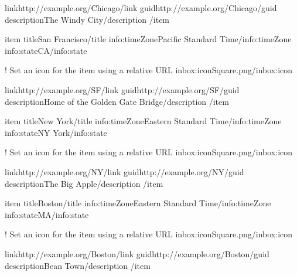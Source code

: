 \documentclass[letterpaper,12pt,english,openany,oneside]{sphinxmanual}
\begin{document}
\begin{sphinxVerbatim}[commandchars=\\\{\}]
           \PYGZlt{}link\PYGZgt{}http://example.org/Chicago\PYGZlt{}/link\PYGZgt{}
           \PYGZlt{}guid\PYGZgt{}http://example.org/Chicago\PYGZlt{}/guid\PYGZgt{}
           \PYGZlt{}description\PYGZgt{}The Windy City\PYGZlt{}/description\PYGZgt{}
       \PYGZlt{}/item\PYGZgt{}

       \PYGZlt{}item\PYGZgt{}
           \PYGZlt{}title\PYGZgt{}San Francisco\PYGZlt{}/title\PYGZgt{}
           \PYGZlt{}info:timeZone\PYGZgt{}Pacific Standard Time\PYGZlt{}/info:timeZone\PYGZgt{}
           \PYGZlt{}info:state\PYGZgt{}CA\PYGZlt{}/info:state\PYGZgt{}

           \PYGZlt{}!\PYGZhy{}\PYGZhy{} Set an icon for the item using a relative URL \PYGZhy{}\PYGZhy{}\PYGZgt{}
           \PYGZlt{}inbox:icon\PYGZgt{}Square.png\PYGZlt{}/inbox:icon\PYGZgt{}

           \PYGZlt{}link\PYGZgt{}http://example.org/SF\PYGZlt{}/link\PYGZgt{}
           \PYGZlt{}guid\PYGZgt{}http://example.org/SF\PYGZlt{}/guid\PYGZgt{}
           \PYGZlt{}description\PYGZgt{}Home of the Golden Gate Bridge\PYGZlt{}/description\PYGZgt{}
       \PYGZlt{}/item\PYGZgt{}

       \PYGZlt{}item\PYGZgt{}
           \PYGZlt{}title\PYGZgt{}New York\PYGZlt{}/title\PYGZgt{}
           \PYGZlt{}info:timeZone\PYGZgt{}Eastern Standard Time\PYGZlt{}/info:timeZone\PYGZgt{}
           \PYGZlt{}info:state\PYGZgt{}NY York\PYGZlt{}/info:state\PYGZgt{}

           \PYGZlt{}!\PYGZhy{}\PYGZhy{} Set an icon for the item using a relative URL \PYGZhy{}\PYGZhy{}\PYGZgt{}
           \PYGZlt{}inbox:icon\PYGZgt{}Square.png\PYGZlt{}/inbox:icon\PYGZgt{}

           \PYGZlt{}link\PYGZgt{}http://example.org/NY\PYGZlt{}/link\PYGZgt{}
           \PYGZlt{}guid\PYGZgt{}http://example.org/NY\PYGZlt{}/guid\PYGZgt{}
           \PYGZlt{}description\PYGZgt{}The Big Apple\PYGZlt{}/description\PYGZgt{}
       \PYGZlt{}/item\PYGZgt{}

       \PYGZlt{}item\PYGZgt{}
           \PYGZlt{}title\PYGZgt{}Boston\PYGZlt{}/title\PYGZgt{}
           \PYGZlt{}info:timeZone\PYGZgt{}Eastern Standard Time\PYGZlt{}/info:timeZone\PYGZgt{}
           \PYGZlt{}info:state\PYGZgt{}MA\PYGZlt{}/info:state\PYGZgt{}

           \PYGZlt{}!\PYGZhy{}\PYGZhy{} Set an icon for the item using a relative URL \PYGZhy{}\PYGZhy{}\PYGZgt{}
           \PYGZlt{}inbox:icon\PYGZgt{}Square.png\PYGZlt{}/inbox:icon\PYGZgt{}

           \PYGZlt{}link\PYGZgt{}http://example.org/Boston\PYGZlt{}/link\PYGZgt{}
           \PYGZlt{}guid\PYGZgt{}http://example.org/Boston\PYGZlt{}/guid\PYGZgt{}
           \PYGZlt{}description\PYGZgt{}Bean Town\PYGZlt{}/description\PYGZgt{}
       \PYGZlt{}/item\PYGZgt{}


\end{sphinxVerbatim}
\end{document}
